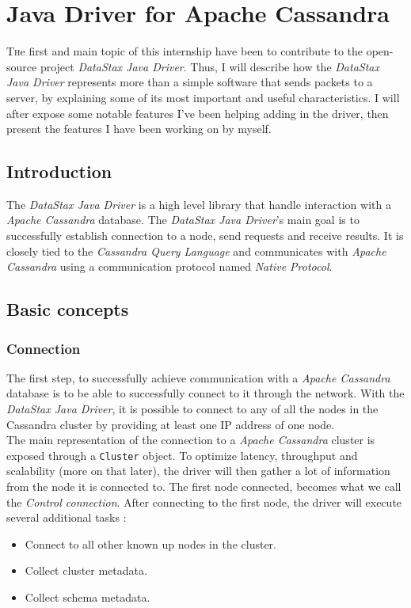 \documentclass[a4paper]{report}
\newcommand{\djd}{\emph{DataStax Java Driver\xspace}}
\newcommand{\ca}{\emph{Apache Cassandra\xspace}}
\begin{document}

\chapter{Java Driver for Apache Cassandra}
\lettrine[nindent=0em,lines=3]{T} he first and main topic of this internship have been to contribute to the open-source project \djd{}. Thus, I will describe how the \djd{} represents more than a simple software that sends packets to a server, by explaining some of its most important and useful characteristics. I will after expose some notable features I've been helping adding in the driver, then present the features I have been working on by myself.
\section{Introduction}
The \djd{} is a high level library that handle interaction with a \ca{} database. The \djd{}'s main goal is to successfully establish connection to a node, send requests and receive results. It is closely tied to the \emph{Cassandra Query Language} and communicates with \ca{} using a communication protocol named \emph{Native Protocol}.

\section{Basic concepts}

\subsection{Connection}
The first step, to successfully achieve communication with a \ca{} database is to be able to successfully connect to it through the network. With the \djd{}, it is possible to connect to any of all the nodes in the Cassandra cluster by providing at least one IP address of one node.\\
The main representation of the connection to a \ca{} cluster is exposed through a \verb;Cluster; object. To optimize latency, throughput and scalability (more on that later), the driver will then gather a lot of information from the node it is connected to. The first node connected, becomes what we call the \emph{Control connection}. After connecting to the first node, the driver will execute several additional tasks :
\begin{itemize}
   \item Connect to all other known up nodes in the cluster.
   \item Collect cluster metadata.
   \item Collect schema metadata.
\end{itemize}
\end{document}
